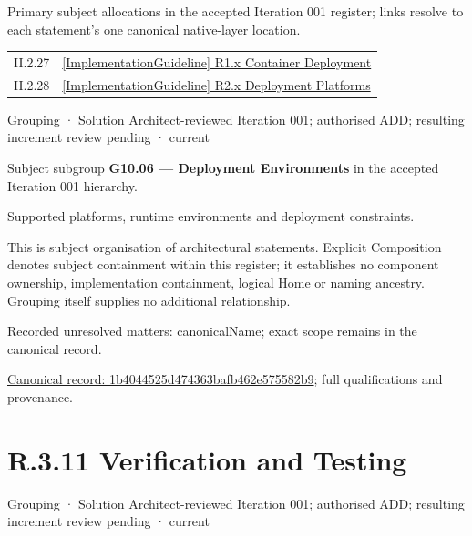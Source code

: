 Primary subject allocations in the accepted Iteration 001 register; links resolve to each statement’s one canonical native-layer location.\par
\begin{longtable}{p{.22\linewidth}p{.73\linewidth}}
II.2.27 & \hyperref[element:536bbcae0de5495a8f4d2e994cdc2232]{[ImplementationGuideline] R1.x Container Deployment} \\
II.2.28 & \hyperref[element:e1521c49b740487e935fa9ecd00675a0]{[ImplementationGuideline] R2.x Deployment Platforms} \\
\end{longtable}
\label{element:1b4044525d474363bafb462e575582b9}
{\small Grouping · Solution Architect-reviewed Iteration 001; authorised ADD; resulting increment review pending · current}\par

Subject subgroup \textbf{G10.06 — Deployment Environments} in the accepted Iteration 001 hierarchy.



Supported platforms, runtime environments and deployment constraints.



This is subject organisation of architectural statements. Explicit Composition denotes subject containment within this register; it establishes no component ownership, implementation containment, logical Home or naming ancestry. Grouping itself supplies no additional relationship.


{\small Recorded unresolved matters: canonicalName; exact scope remains in the canonical record.}\par
{\footnotesize \href{../../../../continuum/grouping/1b4044525d474363bafb462e575582b9.md}{Canonical record: 1b4044525d474363bafb462e575582b9}; full qualifications and provenance.}\par
\section*{R.3.11 Verification and Testing}
\label{navigation:R.3.11}

\label{element:d0fa8cfaf5044359a5f6a1e91375429e}
{\small Grouping · Solution Architect-reviewed Iteration 001; authorised ADD; resulting increment review pending · current}\par

